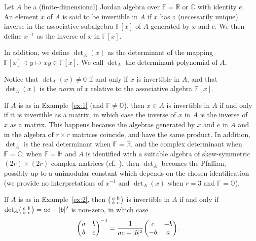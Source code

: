 \documentclass[10.5pt,reqno]{amsart}
\DeclarePairedDelimiter{\abs}{\lvert}{\rvert}
\let\originalleft\left
\let\originalright\right
\renewcommand{\left}{\mathopen{}\mathclose\bgroup\originalleft}
\renewcommand{\right}{\aftergroup\egroup\originalright}
\newcommand{\C}{\mathds{C}}
\newcommand{\Hd}{\mathds{H}}
\newcommand{\Od}{\mathds{O}}
\newcommand{\R}{\mathds{R}}
\newcommand{\F}{\mathds{F}}
\begin{document}
\begin{deff}
	Let $A$ be a (finite-dimensional) Jordan algebra over $\F=\R$ or $\C$ with identity $e$. An element $x$ of $ A$ is said to be invertible in $A$ if $x$ has a (necessarily unique) inverse in the associative subalgebra $\F[x]$ of $A$ generated by $x$ and $e$. We then define $x^{-1}$ as the inverse of $x$ in $\F[x]$.
	
	In addition, we define $\det_A(x)$ as the determinant of the mapping $\F[x]\ni y\mapsto x y\in \F[x]$. We call $\det_A$ the determinant polynomial of $A$.
\end{deff}

Notice that $\det_A(x)\neq 0$ if and only if $x$ is invertible in $A$, and that $\det_A(x)$ is the \emph{norm} of $x$ relative to the associative algebra $\F[x]$.

\begin{ex}\label{ex:3}
	If $A$ is as in Example~\ref{ex:1} (and $\F\neq \Od$), then $x\in A$ is invertible in $A$ if and only if it is invertible as a matrix, in which case the inverse of $x$ in $A$ is the inverse of $x$ as a matrix. This happens because the algebras generated by $x$ and $e$ in $A$ and in the algebra of $r \times r$ matrices coincide, and have the same product. In addition, $\det_A$ is the real determinant when $\F=\R$, and the complex determinant when $\F=\C$; when $\F=\Hd$ and $A$ is identified with a suitable algebra of skew-symmetric $(2r)\times (2 r)$ complex matrices (cf.~\cite[p.~88]{FarautKoranyi}), then $\det_A$ becomes the Pfaffian, possibly up to a unimodular constant which depends on the chosen identification (we provide no interpretations of $x^{-1}$ and $\det_A(x)$ when $r= 3$ and $\F=\Od$).
	
	If $A$ is as in Example~\ref{ex:2}, then $\left(\begin{smallmatrix} a & b\\ b & c \end{smallmatrix}\right)$ is invertible in $A$ if and only if $\det_A \left(\begin{smallmatrix} a & b\\ b & c \end{smallmatrix}\right)= ac- \abs{b}^2$ is non-zero, in which case
	\[
	\left(\begin{matrix} a & b\\ b & c \end{matrix}\right)^{-1}=\frac{1}{ac-\abs{b}^2} \left(\begin{matrix} c & -b\\ -b & a \end{matrix}\right).
	\]
\end{ex}
\end{document}
